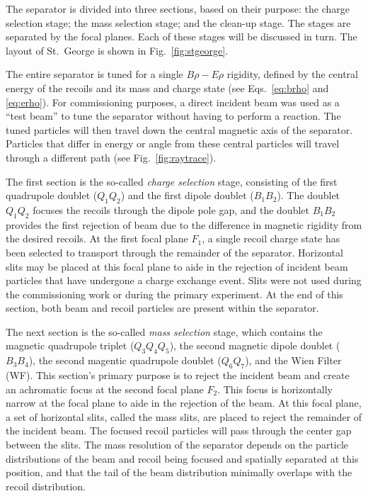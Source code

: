 The separator is divided into three sections, based on their purpose: the
charge selection stage; the mass selection
stage; and the clean-up stage. The stages are separated by the focal planes.
Each of these stages will be discussed in turn. The layout of
St.\ George is shown in Fig.~\ref{fig:stgeorge}.

The entire separator is tuned for a single $B\rho-E\rho$ rigidity, defined by
the central energy of the recoils and its mass and charge state (see
Eqs.~\ref{eq:brho} and \ref{eq:erho}). For commissioning purposes, a direct
incident beam was used as a ``test beam'' to tune the separator without having
to perform a reaction. The tuned particles will then travel down the central
magnetic axis of the separator. Particles that differ in energy or angle from
these central particles will travel through a different path (see
Fig.~\ref{fig:raytrace}).

The first section is the so-called \textit{charge selection} stage, consisting
of the
first quadrupole doublet ($Q_1Q_2$) and the first dipole doublet ($B_1B_2$).
The doublet $Q_1Q_2$ focuses the recoils through the dipole pole gap, and the
doublet $B_1B_2$ provides the first rejection of beam due to the difference in
magnetic rigidity from the desired recoils. At the first focal plane $F_1$, a
single recoil charge state has been selected to transport through the remainder
of the separator. Horizontal slits may be placed at this focal plane to aide in
the rejection of incident beam particles that have undergone a charge exchange
event. Slits were not used during the commissioning work or during the primary
experiment. At the end of this section, both beam and recoil particles are
present within the separator.

The next section is the so-called \textit{mass selection} stage, which contains
the
magnetic quadrupole triplet ($Q_3Q_4Q_5$), the second magnetic dipole doublet
($B_3B_4$), the second magentic quadrupole doublet ($Q_6Q_7$), and the Wien
Filter (WF). This section's primary purpose is to reject the incident beam and
create an achromatic focus at the second focal plane $F_2$. This focus is
horizontally narrow at the focal plane to aide in the rejection of the beam.
At this focal plane, a set of horizontal slits, called the mass slits,
are placed to reject the remainder of the incident beam. The focused recoil
particles will pass through the center gap between the slits. The mass
resolution of the separator depends on the particle distributions of the beam
and recoil being focused and spatially separated at this position, and that the
tail of the beam distribution minimally overlaps with the recoil distribution.

